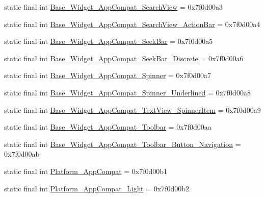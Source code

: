 \begin{DoxyCompactItemize}
\item 
static final int \mbox{\hyperlink{classandroid_1_1support_1_1v7_1_1appcompat_1_1R_1_1style_adf99f9c449db79c9efcec858c9d160e5}{Base\+\_\+\+Widget\+\_\+\+App\+Compat\+\_\+\+Search\+View}} = 0x7f0d00a3
\item 
static final int \mbox{\hyperlink{classandroid_1_1support_1_1v7_1_1appcompat_1_1R_1_1style_ae6ba0c44709eea91e99cd7338c24d98b}{Base\+\_\+\+Widget\+\_\+\+App\+Compat\+\_\+\+Search\+View\+\_\+\+Action\+Bar}} = 0x7f0d00a4
\item 
static final int \mbox{\hyperlink{classandroid_1_1support_1_1v7_1_1appcompat_1_1R_1_1style_a6df5305b0830c671718736249bc52921}{Base\+\_\+\+Widget\+\_\+\+App\+Compat\+\_\+\+Seek\+Bar}} = 0x7f0d00a5
\item 
static final int \mbox{\hyperlink{classandroid_1_1support_1_1v7_1_1appcompat_1_1R_1_1style_a7f43cb37b584c1458744cd714e8bd57b}{Base\+\_\+\+Widget\+\_\+\+App\+Compat\+\_\+\+Seek\+Bar\+\_\+\+Discrete}} = 0x7f0d00a6
\item 
static final int \mbox{\hyperlink{classandroid_1_1support_1_1v7_1_1appcompat_1_1R_1_1style_a7aebba64b6a5890c12ec4fd4196b36cc}{Base\+\_\+\+Widget\+\_\+\+App\+Compat\+\_\+\+Spinner}} = 0x7f0d00a7
\item 
static final int \mbox{\hyperlink{classandroid_1_1support_1_1v7_1_1appcompat_1_1R_1_1style_a320d36af9a1b161f8d8bceb2add804af}{Base\+\_\+\+Widget\+\_\+\+App\+Compat\+\_\+\+Spinner\+\_\+\+Underlined}} = 0x7f0d00a8
\item 
static final int \mbox{\hyperlink{classandroid_1_1support_1_1v7_1_1appcompat_1_1R_1_1style_a2b2ea8aed9a7cfd0340087f3b14f273f}{Base\+\_\+\+Widget\+\_\+\+App\+Compat\+\_\+\+Text\+View\+\_\+\+Spinner\+Item}} = 0x7f0d00a9
\item 
static final int \mbox{\hyperlink{classandroid_1_1support_1_1v7_1_1appcompat_1_1R_1_1style_ab2a5b30c6563b433f6b30f720c9febdb}{Base\+\_\+\+Widget\+\_\+\+App\+Compat\+\_\+\+Toolbar}} = 0x7f0d00aa
\item 
static final int \mbox{\hyperlink{classandroid_1_1support_1_1v7_1_1appcompat_1_1R_1_1style_ad89e1f45e5f45327367aaeb165887dda}{Base\+\_\+\+Widget\+\_\+\+App\+Compat\+\_\+\+Toolbar\+\_\+\+Button\+\_\+\+Navigation}} = 0x7f0d00ab
\item 
static final int \mbox{\hyperlink{classandroid_1_1support_1_1v7_1_1appcompat_1_1R_1_1style_a384c9f78df3b7c85d4456ea70e0f1a6b}{Platform\+\_\+\+App\+Compat}} = 0x7f0d00b1
\item 
static final int \mbox{\hyperlink{classandroid_1_1support_1_1v7_1_1appcompat_1_1R_1_1style_aec8d69dfc75b377e70dab4450522249f}{Platform\+\_\+\+App\+Compat\+\_\+\+Light}} = 0x7f0d00b2

\end{DoxyCompactItemize}
